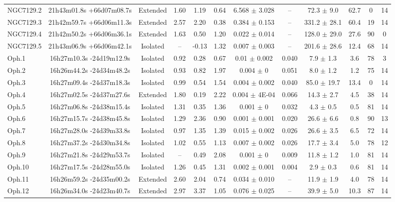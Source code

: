 \begin{landscape}
\begin{longtable}{lccccccccccc}
NGC7129.2	&	21h43m01.8s +66d07m08.7s	&	Extended	&	1.60	&	1.19	&	0.64	&	6.568	$\pm$	3.028	&	--	&	72.3	$\pm$	9.0	&	62.7	&	0	&	14	\\
NGC7129.3	&	21h42m59.7s +66d06m11.3s	&	Extended	&	2.57	&	2.20	&	0.38	&	0.384	$\pm$	0.153	&	--	&	331.2	$\pm$	28.1	&	60.4	&	19	&	14	\\
NGC7129.4	&	21h42m50.2s +66d06m36.1s	&	Extended	&	1.63	&	0.50	&	1.20	&	0.022	$\pm$	0.014	&	--	&	128.0	$\pm$	29.0	&	27.6	&	90	&	0	\\
NGC7129.5	&	21h43m06.9s +66d06m42.1s	&	Isolated	&	--	&	-0.13	&	1.32	&	0.007	$\pm$	0.003	&	--	&	201.6	$\pm$	28.6	&	12.4	&	68	&	14	\\
Oph.1	&	16h27m10.3s -24d19m12.9s	&	Isolated	&	0.92	&	0.28	&	0.67	&	0.01	$\pm$	0.002	&	0.040	&	7.9	$\pm$	1.3	&	3.6	&	78	&	3	\\
Oph.2	&	16h26m44.2s -24d34m48.2s	&	Isolated	&	0.93	&	0.82	&	1.97	&	0.004	$\pm$	0	&	0.051	&	8.0	$\pm$	1.2	&	1.2	&	75	&	14	\\
Oph.3	&	16h27m09.4s -24d37m18.3s	&	Isolated	&	0.99	&	0.54	&	1.54	&	0.004	$\pm$	0.002	&	0.040	&	85.0	$\pm$	19.7	&	13.4	&	0	&	14	\\
Oph.4	&	16h27m02.5s -24d37m27.6s	&	Extended	&	1.80	&	0.19	&	2.22	&	0.004	$\pm$	4E-04	&	0.066	&	14.3	$\pm$	2.7	&	4.5	&	38	&	14	\\
Oph.5	&	16h27m06.8s -24d38m15.4s	&	Isolated	&	1.31	&	0.35	&	1.36	&	0.001	$\pm$	0	&	0.032	&	4.3	$\pm$	0.5	&	0.5	&	81	&	14	\\
Oph.6	&	16h27m15.7s -24d38m45.8s	&	Isolated	&	1.29	&	2.36	&	0.90	&	0.001	$\pm$	0.001	&	0.020	&	26.6	$\pm$	6.6	&	0.8	&	90	&	13	\\
Oph.7	&	16h27m28.0s -24d39m33.8s	&	Isolated	&	0.97	&	1.35	&	1.39	&	0.015	$\pm$	0.002	&	0.026	&	26.6	$\pm$	3.5	&	6.5	&	72	&	14	\\
Oph.8	&	16h27m37.2s -24d30m34.8s	&	Isolated	&	1.02	&	0.55	&	1.13	&	0.007	$\pm$	0.002	&	0.026	&	17.7	$\pm$	3.4	&	5.0	&	78	&	12	\\
Oph.9	&	16h27m21.8s -24d29m53.7s	&	Isolated	&	--	&	0.49	&	2.08	&	0.001	$\pm$	0	&	0.009	&	11.8	$\pm$	1.2	&	1.0	&	81	&	14	\\
Oph.10	&	16h27m17.5s -24d28m55.0s	&	Isolated	&	1.26	&	0.45	&	1.31	&	0.002	$\pm$	0.001	&	0.004	&	2.9	$\pm$	0.3	&	0.6	&	81	&	14	\\
Oph.11	&	16h26m59.2s -24d35m00.2s	&	Extended	&	2.60	&	2.04	&	0.74	&	0.034	$\pm$	0.010	&	--	&	11.9	$\pm$	1.9	&	4.0	&	78	&	14	\\
Oph.12	&	16h26m34.0s -24d23m40.7s	&	Extended	&	2.97	&	3.37	&	1.05	&	0.076	$\pm$	0.025	&	--	&	39.9	$\pm$	5.0	&	10.3	&	87	&	14	\\

\end{longtable}
\end{landscape}
